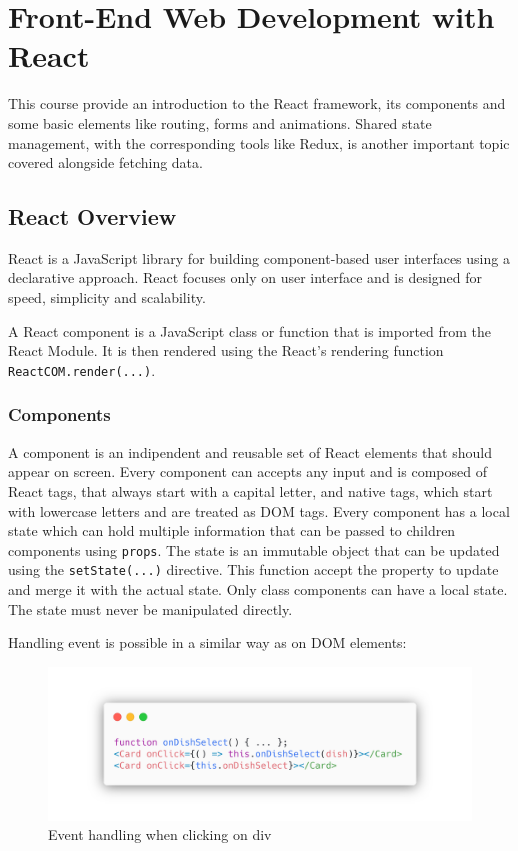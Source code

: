 \section*{Front-End Web Development with React}

This course provide an introduction to the React framework, its components and some basic elements like routing, forms and animations. Shared state management, with the corresponding tools like Redux, is another important topic covered alongside fetching data.

\subsection*{React Overview}

React is a JavaScript library for building component-based user interfaces using a declarative approach. React focuses only on user interface and is designed for speed, simplicity and scalability.

A React component is a JavaScript class or function that  is imported from the React Module. It is then rendered using the React's rendering function \texttt{ReactCOM.render(...)}.

\subsubsection*{Components}
A component is an indipendent and reusable set of React elements that should appear on screen. Every component can accepts any input and is composed of React tags, that always start with a capital letter, and native tags, which start with lowercase letters and are treated as DOM tags.
Every component has a local state which can hold multiple information that can be passed to children components using \texttt{props}. The state is an immutable object that can be updated using the \texttt{setState(...)} directive. This function accept the property to update and merge it with the actual state. Only class components can have a local state. The state must never be manipulated directly.

Handling event is possible in a similar way as on DOM elements:

\begin{figure}[h]
    \includegraphics[width=\textwidth]{assets/react-event-handling.png}
    \caption{Event handling when clicking on div}
    \label{fig:event-handling}
\end{figure}


